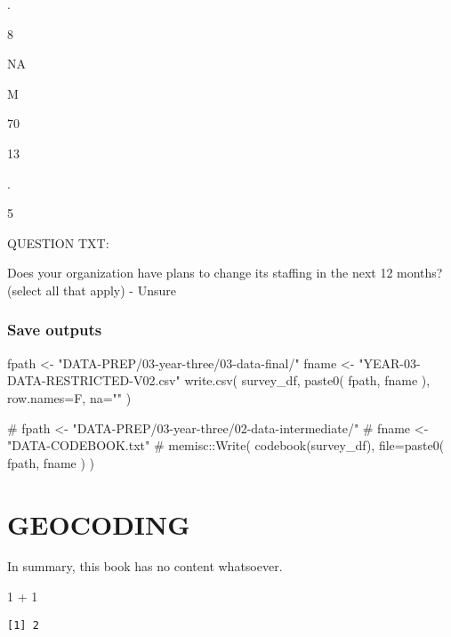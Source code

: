 \documentclass[
  letterpaper,
]{scrbook}
\newenvironment{Shaded}{\begin{snugshade}}{\end{snugshade}}
\newcommand{\AttributeTok}[1]{\textcolor[rgb]{0.40,0.45,0.13}{#1}}
\newcommand{\CommentTok}[1]{\textcolor[rgb]{0.37,0.37,0.37}{#1}}
\newcommand{\DecValTok}[1]{\textcolor[rgb]{0.68,0.00,0.00}{#1}}
\newcommand{\FunctionTok}[1]{\textcolor[rgb]{0.28,0.35,0.67}{#1}}
\newcommand{\NormalTok}[1]{\textcolor[rgb]{0.00,0.23,0.31}{#1}}
\newcommand{\OtherTok}[1]{\textcolor[rgb]{0.00,0.23,0.31}{#1}}
\newcommand{\SpecialCharTok}[1]{\textcolor[rgb]{0.37,0.37,0.37}{#1}}
\newcommand{\StringTok}[1]{\textcolor[rgb]{0.13,0.47,0.30}{#1}}
\begin{document}
.

8

NA

M

70

13

.

5

QUESTION TXT:

Does your organization have plans to change its staffing in the next 12
months? (select all that apply) - Unsure

\section{Save outputs}\label{save-outputs-1}

\begin{Shaded}
\begin{Highlighting}[]
\NormalTok{fpath }\OtherTok{\textless{}{-}} \StringTok{"DATA{-}PREP/03{-}year{-}three/03{-}data{-}final/"}
\NormalTok{fname }\OtherTok{\textless{}{-}} \StringTok{"YEAR{-}03{-}DATA{-}RESTRICTED{-}V02.csv"}
\FunctionTok{write.csv}\NormalTok{( survey\_df, }\FunctionTok{paste0}\NormalTok{( fpath, fname ), }\AttributeTok{row.names=}\NormalTok{F, }\AttributeTok{na=}\StringTok{""}\NormalTok{ )}
\end{Highlighting}
\end{Shaded}

\begin{Shaded}
\begin{Highlighting}[]
\CommentTok{\# fpath \textless{}{-} "DATA{-}PREP/03{-}year{-}three/02{-}data{-}intermediate/"}
\CommentTok{\# fname \textless{}{-} "DATA{-}CODEBOOK.txt"}
\CommentTok{\# memisc::Write( codebook(survey\_df), file=paste0( fpath, fname ) )}
\end{Highlighting}
\end{Shaded}

\part{GEOCODING}

In summary, this book has no content whatsoever.

\begin{Shaded}
\begin{Highlighting}[]
\DecValTok{1} \SpecialCharTok{+} \DecValTok{1}
\end{Highlighting}
\end{Shaded}

\begin{verbatim}
[1] 2
\end{verbatim}
\end{document}
